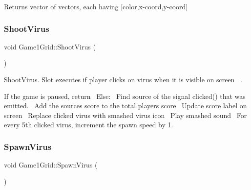 \begin{DoxyReturn}{Returns}
vector of vectors, each having \mbox{[}color,x-\/coord,y-\/coord\mbox{]} 
\end{DoxyReturn}
\mbox{\label{classGame1Grid_af541011eb2e1168669dde5b9cdd29a77}} 
\subsubsection{\texorpdfstring{Shoot\+Virus}{ShootVirus}}
{\footnotesize\ttfamily void Game1\+Grid\+::\+Shoot\+Virus (\begin{DoxyParamCaption}{ }\end{DoxyParamCaption})\hspace{0.3cm}{\ttfamily [slot]}}



Shoot\+Virus. Slot executes if player clicks on virus when it is visible on screen~\newline
. 

If the game is paused, return~\newline
Else\+:~\newline
Find source of the signal clicked() that was emitted.~\newline
Add the source\textquotesingle{}s score to the total player\textquotesingle{}s score~\newline
Update score label on screen~\newline
Replace clicked virus with smashed virus icon~\newline
Play smashed sound~\newline
For every 5th clicked virus, increment the spawn speed by 1. \mbox{\label{classGame1Grid_a8ae09d14f2ffbcf3fa65f917ade6fb8d}} 
\subsubsection{\texorpdfstring{Spawn\+Virus}{SpawnVirus}}
{\footnotesize\ttfamily void Game1\+Grid\+::\+Spawn\+Virus (\begin{DoxyParamCaption}{ }\end{DoxyParamCaption})\hspace{0.3cm}{\ttfamily [slot]}}



